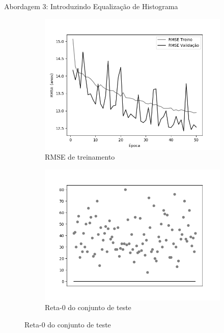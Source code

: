 \begin{frame}{\large{Abordagem 3: Introduzindo Equalização de Histograma}}
\begin{figure}[h!]
  \caption{Resultados do treinamento e teste da CNN LeNet \emph{ReLU}}
  \begin{subfigure}[hb]{0.4\textwidth}
    \caption{RMSE de treinamento}
    \includegraphics[width=\linewidth]{img/graficos/history/lenet/fig-history-image-treat-3-lenet-relu-rmse.png}%
  \end{subfigure}%
  \begin{subfigure}[hb]{0.4\textwidth}
    \caption{Reta-0 do conjunto de teste}
    \includegraphics[width=\linewidth]{img/graficos/reta0/lenet/fig-reta-0-image-treat-3-lenet-relu.png}%
  \end{subfigure}
\end{figure}
\end{frame}

